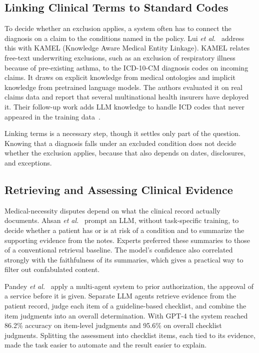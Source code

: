 \documentclass[conference]{IEEEtran}
\begin{document}
\subsection{Linking Clinical Terms to Standard Codes}
To decide whether an exclusion applies, a system often has to connect the diagnosis on a claim to the conditions named in the policy. Lui \textit{et al.}~\cite{kamel2024} address this with KAMEL (Knowledge Aware Medical Entity Linkage). KAMEL relates free-text underwriting exclusions, such as an exclusion of respiratory illness because of pre-existing asthma, to the ICD-10-CM diagnosis codes on incoming claims. It draws on explicit knowledge from medical ontologies and implicit knowledge from pretrained language models. The authors evaluated it on real claims data and report that several multinational health insurers have deployed it. Their follow-up work adds LLM knowledge to handle ICD codes that never appeared in the training data~\cite{lui2024}.

Linking terms is a necessary step, though it settles only part of the question. Knowing that a diagnosis falls under an excluded condition does not decide whether the exclusion applies, because that also depends on dates, disclosures, and exceptions.

\subsection{Retrieving and Assessing Clinical Evidence}
Medical-necessity disputes depend on what the clinical record actually documents. Ahsan \textit{et al.}~\cite{ahsan2023} prompt an LLM, without task-specific training, to decide whether a patient has or is at risk of a condition and to summarize the supporting evidence from the notes. Experts preferred these summaries to those of a conventional retrieval baseline. The model's confidence also correlated strongly with the faithfulness of its summaries, which gives a practical way to filter out confabulated content.

Pandey \textit{et al.}~\cite{pandey2024} apply a multi-agent system to prior authorization, the approval of a service before it is given. Separate LLM agents retrieve evidence from the patient record, judge each item of a guideline-based checklist, and combine the item judgments into an overall determination. With GPT-4 the system reached 86.2\% accuracy on item-level judgments and 95.6\% on overall checklist judgments. Splitting the assessment into checklist items, each tied to its evidence, made the task easier to automate and the result easier to explain.
\end{document}

